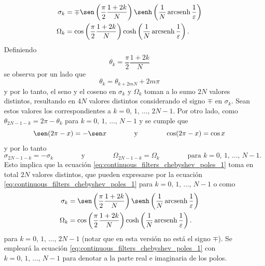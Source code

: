 \documentclass[a4paper]{report}
\DeclareMathOperator{\arcsenh}{arcsenh}
\begin{document}
\begin{equation}\label{eq:continuous_filters_chebyshev_poles_1}
 \begin{aligned}
  \sigma_k&=\mp\sen\left(\frac{\pi}{2}\frac{1+2k}{N}\right)\senh\left(\frac{1}{N}\arcsenh\frac{1}{\varepsilon}\right)\\
  \Omega_k&=\cos\left(\frac{\pi}{2}\frac{1+2k}{N}\right)\cosh\left(\frac{1}{N}\arcsenh\frac{1}{\varepsilon}\right).
 \end{aligned}
\end{equation}
Definiendo
\[
 \theta_k=\frac{\pi}{2}\frac{1+2k}{N}
\]
se observa por un lado que 
\[
 \theta_k=\theta_{k+2mN}+2m\pi
\]
y por lo tanto, el seno y el coseno en \(\sigma_k\) y \(\Omega_k\) toman a lo sumo \(2N\) valores distintos, resultando en \(4N\) valores distintos considerando el signo \(\mp\) en \(\sigma_k\). Sean estos valores los correspondientes a \(k=0,\,1,\,\dots,\,2N-1\). Por otro lado, como \(\theta_{2N-1-k}=2\pi-\theta_k\) para \(k=0,\,1,\,\dots,\,N-1\) y se cumple que 
\[
 \sen(2\pi-x)=-\sen x
 \qquad\qquad\textrm{y}\qquad\qquad
 \cos(2\pi-x)=\cos x
\]
y por lo tanto
\[
 \sigma_{2N-1-k}=-\sigma_k
 \qquad\qquad\textrm{y}\qquad\qquad
 \Omega_{2N-1-k}=\Omega_k
 \qquad\qquad\textrm{para }k=0,\,1,\,\dots,\,N-1.
\]
Esto implica que la ecuación \ref{eq:continuous_filters_chebyshev_poles_1} toma en total \(2N\) valores distintos, que pueden expresarse por la  ecuación \ref{eq:continuous_filters_chebyshev_poles_1} para \(k=0,\,1,\,\dots,\,N-1\) o como  
\[
 \begin{aligned}
  \sigma_k&=\sen\left(\frac{\pi}{2}\frac{1+2k}{N}\right)\senh\left(\frac{1}{N}\arcsenh\frac{1}{\varepsilon}\right)\\
  \Omega_k&=\cos\left(\frac{\pi}{2}\frac{1+2k}{N}\right)\cosh\left(\frac{1}{N}\arcsenh\frac{1}{\varepsilon}\right).
 \end{aligned}
\]
para \(k=0,\,1,\,\dots,\,2N-1\) (notar que en esta versión no está el signo \(\mp\)). Se empleará la ecuación \ref{eq:continuous_filters_chebyshev_poles_1} con \(k=0,\,1,\,\dots,\,N-1\) para denotar a la parte real e imaginaria de los polos.
\end{document}
